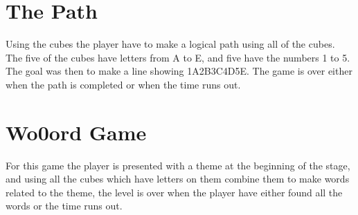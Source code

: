 \section{The Path}
\label{game:the_path}
Using the cubes the player have to make a logical path using all of the cubes. The five of the cubes have letters from A to E, and five have the numbers 1 to 5. The goal was then to make a line showing 1A2B3C4D5E. The game is over either when the path is completed or when the time runs out.

\section{Wo0ord Game}
\label{game:wo0ord_game}
For this game the player is presented with a theme at the beginning of the stage, and using all the cubes which have letters on them combine them to make words related to the theme, the level is over when the player have either found all the words or the time runs out.

